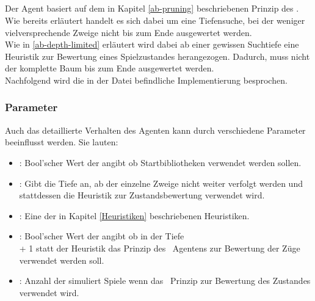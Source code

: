 \subsection{\abp}
Der Agent \mxZitat{\abp} basiert auf dem in Kapitel \ref{ab-pruning} beschriebenen Prinzip des \ababs. Wie bereits erläutert handelt es sich dabei um eine Tiefensuche, bei der weniger vielversprechende Zweige nicht bis zum Ende ausgewertet werden.
\\Wie in \ref{ab-depth-limited} erläutert wird dabei ab einer gewissen Suchtiefe eine Heuristik zur Bewertung eines Spielzustandes herangezogen. Dadurch, muss nicht der komplette Baum bis zum Ende ausgewertet werden.  
\\Nachfolgend wird die in der Datei  befindliche Implementierung besprochen.
\subsubsection{Parameter}
Auch das detaillierte Verhalten des Agenten \mxZitat{\abp} kann durch verschiedene Parameter beeinflusst werden. Sie lauten:
\begin{itemize}
\item {}: Bool'scher Wert der angibt ob Startbibliotheken verwendet werden sollen.
\item {}: Gibt die Tiefe an, ab der einzelne Zweige nicht weiter verfolgt werden und stattdessen die Heuristik zur Zustandsbewertung verwendet wird.
\item {}: Eine der in Kapitel \ref{Heuristiken} beschriebenen Heuristiken.
\item {}: Bool'scher Wert der angibt ob in der Tiefe \\ + 1 statt der Heuristik das Prinzip des \mc\ Agentens zur Bewertung der Züge verwendet werden soll.
\item {}: Anzahl der simuliert Spiele wenn das \mc\ Prinzip zur Bewertung des Zustandes verwendet wird.
\end{itemize}
